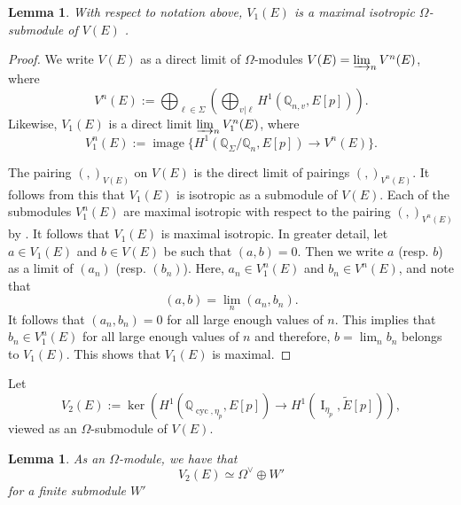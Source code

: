 \documentclass[12pt]{amsart}
\newtheorem{lemma}[theorem]{Lemma}
\newcommand{\Q}{\mathbb{Q}}
\newcommand{\op}[1]{\operatorname{#1}}
\numberwithin{equation}{section}
\begin{document}
\begin{lemma}\label{V1 is maxl iso}
    With respect to notation above, $V_1(E)$ is a maximal isotropic $\Omega$-submodule of $V(E)$ .
\end{lemma}
\begin{proof}
    We write $V(E)$ as a direct limit of $\Omega$-modules $V(E)=\varinjlim_n V^n(E)$,
    where \[V^n(E):=\bigoplus_{\ell\in \Sigma} \left(\bigoplus_{v|\ell} H^1(\Q_{n, v}, E[p]) \right).\]
    Likewise, $V_1(E)$ is a direct limit $\varinjlim_n V_1^n(E)$, where 
    \[V_1^n(E):=\op{image}\{H^1(\Q_\Sigma/\Q_n, E[p])\longrightarrow V^n(E)\}.\]

    The pairing $(,)_{V(E)}$ on $V(E)$ is the direct limit of pairings $(,)_{V^n(E)}$. It follows from this that $V_1(E)$ is isotropic as a submodule of $V(E)$. Each of the submodules $V_1^n(E)$ are maximal isotropic with respect to the pairing $(,)_{V^n(E)}$ by \cite[Theorem 4.14 and remark 4.15]{poonen}. It follows that $V_1(E)$ is maximal isotropic. In greater detail, let $a\in V_1(E)$ and $b\in V(E)$ be such that $(a,b)=0$. Then we write $a$ (resp. $b$) as a limit of $(a_n)$ (resp. $(b_n)$). Here, $a_n\in V_1^n(E)$ and $b_n\in V^n(E)$, and note that 
    \[(a,b)=\lim_n (a_n, b_n).\] It follows that $(a_n, b_n)=0$ for all large enough values of $n$. This implies that $b_n\in V_1^n(E)$ for all large enough values of $n$ and therefore, $b=\lim_n b_n$ belongs to $V_1(E)$. This shows that $V_1(E)$ is maximal. 
\end{proof}
Let \[V_2(E):=\op{ker}\left(H^1(\Q_{\op{cyc}, \eta_p}, E[p])\longrightarrow H^1(\op{I}_{\eta_p}, \widetilde{E}[p])\right),\] viewed as an $\Omega$-submodule of $V(E)$. 
\begin{lemma} \label{V2 corank lemma} 
    As an $\Omega$-module, we have that
    \[V_2(E)\simeq \Omega^\vee \oplus W'\]
    for a finite submodule $W'$
\end{lemma}
\end{document}
